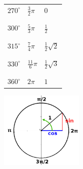\documentclass[6pt,a4paper]{scrartcl}
\begin{document}
\begin{multicols*}{2}
\begin{tabular}{lll}
$270^\circ$ & $\frac{3}{2}\pi$  & $0$ \\
\\
\hline
\\
$300^\circ$ & $\frac{5}{3}\pi$  & $\frac{1}{2}$ \\
\\
\hline
\\
$315^\circ$ & $\frac{7}{4}\pi$  & $\frac{1}{2}\sqrt{2}$ \\
\\
\hline
\\
$330^\circ$ & $\frac{11}{6}\pi$ & $\frac{1}{2}\sqrt{3}$ \\
\\
\hline
\\
$360^\circ$ & $2\pi$            & $1$ \\
\end{tabular}

\includegraphics[width=150px]{einheitskreis1.png}

\end{multicols*}


\end{document}
